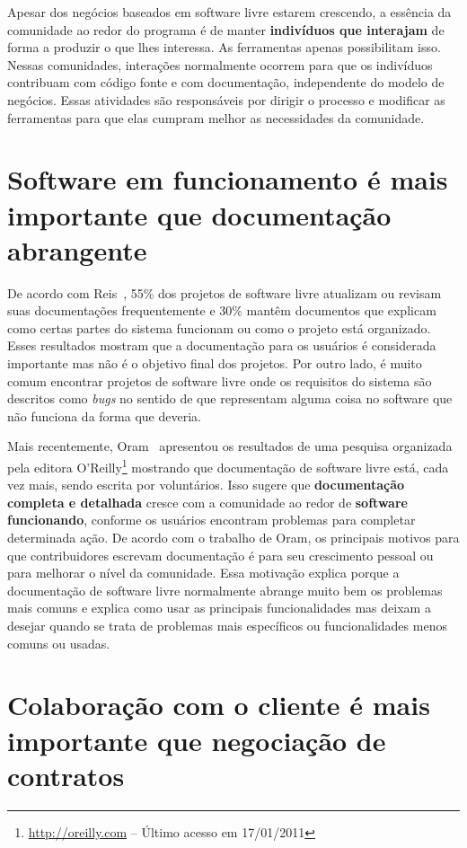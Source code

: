 Apesar dos negócios baseados em software livre estarem crescendo, a
essência da comunidade ao redor do programa é de manter
\textbf{indivíduos que interajam} de forma a produzir o que lhes
interessa. As ferramentas apenas possibilitam isso. Nessas
comunidades, interações normalmente ocorrem para que os indivíduos
contribuam com código fonte e com documentação, independente do modelo
de negócios. Essas atividades são responsáveis por dirigir o processo
e modificar as ferramentas para que elas cumpram melhor as
necessidades da comunidade.

\section{Software em funcionamento é mais importante que documentação
  abrangente}
\label{sec:second-princ}

De acordo com Reis~\cite{Reis2003}, 55\% dos projetos de software
livre atualizam ou revisam suas documentações frequentemente e 30\%
mantêm documentos que explicam como certas partes do sistema funcionam
ou como o projeto está organizado. Esses resultados mostram que a
documentação para os usuários é considerada importante mas não é o
objetivo final dos projetos. Por outro lado, é muito comum encontrar
projetos de software livre onde os requisitos do sistema são descritos
como \emph{bugs} no sentido de que representam alguma coisa no
software que não funciona da forma que deveria.

Mais recentemente, Oram~\cite{Oram2007} apresentou os resultados de
uma pesquisa organizada pela editora
O'Reilly\footnote{\url{http://oreilly.com} -- Último acesso em
  17/01/2011} mostrando que documentação de software livre está, cada
vez mais, sendo escrita por voluntários. Isso sugere que
\textbf{documentação completa e detalhada} cresce com a comunidade ao
redor de \textbf{software funcionando}, conforme os usuários encontram
problemas para completar determinada ação. De acordo com o trabalho de
Oram, os principais motivos para que contribuidores escrevam
documentação é para seu crescimento pessoal ou para melhorar o nível
da comunidade. Essa motivação explica porque a documentação de
software livre normalmente abrange muito bem os problemas mais comuns
e explica como usar as principais funcionalidades mas deixam a desejar
quando se trata de problemas mais específicos ou funcionalidades menos
comuns ou usadas.

\section{Colaboração com o cliente é mais importante que negociação de
  contratos}
\label{sec:third-princ}

